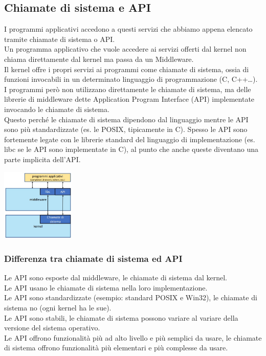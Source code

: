 \begin{description}
\section{Chiamate di sistema e API}
I programmi applicativi accedono a questi servizi che abbiamo appena elencato tramite chiamate di sistema o API.\\
Un programma applicativo che vuole accedere ai servizi offerti dal kernel non chiama direttamente dal kernel ma passa da un Middleware.\\
Il kernel offre i propri servizi ai programmi come chiamate di sistema, ossia di funzioni invocabili in un determinato linguaggio di programmazione (C, C++\dots).\\
I programmi però non utilizzano direttamente le chiamate di sistema, ma delle librerie di middleware dette Application Program Interface (API) implementate invocando le chiamate di sistema.\\
Questo perché le chiamate di sistema dipendono dal linguaggio mentre le API sono più standardizzate (es. le POSIX, tipicamente in C). Spesso le API sono fortemente legate con le librerie standard del linguaggio di implementazione (es. libc se le API sono implementate in C), al punto che anche queste diventano una parte implicita dell'API.
\begin{center}
    \includegraphics[width=35mm]{images/SO/SO_chiamatedisistema_API1.jpg}
\end{center}

\subsubsection{Differenza tra chiamate di sistema ed API}
Le API sono esposte dal middleware, le chiamate di sistema dal kernel.\\
Le API usano le chiamate di sistema nella loro implementazione.\\
Le API sono standardizzate (esempio: standard POSIX e Win32), le chiamate di sistema no (ogni kernel ha le sue).\\
Le API sono stabili, le chiamate di sistema possono variare al variare della versione del sistema operativo.\\
Le API offrono funzionalità più ad alto livello e più semplici da usare, le chiamate di sistema offrono funzionalità più elementari e più complesse da usare.


\end{description}

